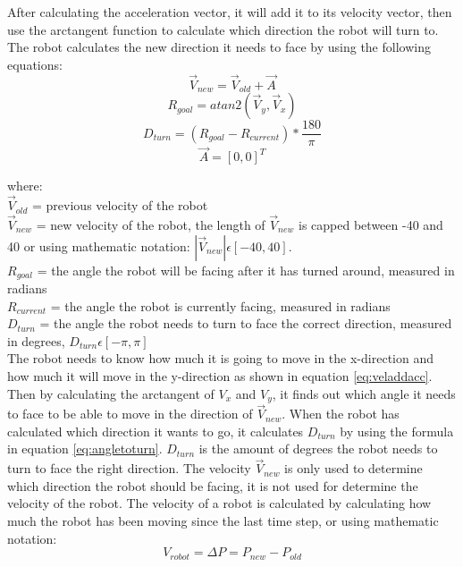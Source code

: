 After calculating the acceleration vector, it will add it to its velocity vector, then use the arctangent function to calculate which direction the robot will turn to. The robot calculates the new direction it needs to face by using the following equations:
\begin{equation}
\label{eq:veladdacc}
\vec{V}_{new} = \vec{V}_{old} + \vec{A}
\end{equation}
\begin{equation}
\label{eq:atan2}
R_{goal} = atan2(\vec{V}_y, \vec{V}_x)
\end{equation}
\begin{equation}
\label{eq:angletoturn}
D_{turn} = (R_{goal} - R_{current})* \frac{180}{\pi}
\end{equation}
\begin{equation}
\label{eq:accelreset}
\vec{A} = [0,0]^T
\end{equation}

where:
\\
$\vec{V}_{old}$ = previous velocity of the robot
\\
$\vec{V}_{new}$ = new velocity of the robot, the length of $\vec{V}_{new}$ is capped between -40 and 40 or using mathematic notation: $ |\vec{V}_{new}| \epsilon [-40,40]$.
\\
$R_{goal}$ = the angle the robot will be facing after it has turned around, measured in radians
\\
$R_{current}$ = the angle the robot is currently facing, measured in radians
\\
$D_{turn}$ = the angle the robot needs to turn to face the correct direction, measured in degrees, $D_{turn} \epsilon [-\pi,\pi]$
\\


The robot needs to know how much it is going to move in the x-direction and how much it will move in the y-direction as shown in equation \ref{eq:veladdacc}.
Then by calculating the arctangent of $V_x$ and $V_y$, it finds out which angle it needs to face to be able to move in the direction of $\vec{V}_{new}$. When the robot has calculated which direction it wants to go, it calculates $D_{turn}$ by using the formula in equation \ref{eq:angletoturn}. $D_{turn}$ is the amount of degrees the robot needs to turn to face the right direction. The velocity $\vec{V}_{new}$ is only used to determine which direction the robot should be facing, it is not used for determine the velocity of the robot. The velocity of a robot is calculated by calculating how much the robot has been moving since the last time step, or using mathematic notation: 
\begin{equation}
\label{eq:calcrobvel}
V_{robot} = \Delta P = P_{new} - P_{old}
\end{equation}

